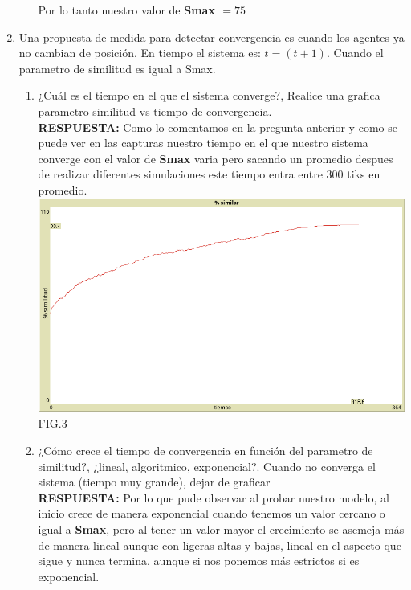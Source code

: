 \documentclass[12pt]{article}
\begin{document}
\begin{enumerate}
\begin{enumerate}
        Por lo tanto nuestro valor de \textbf{Smax $=75$}
    \end{enumerate}
    \item Una propuesta de medida para detectar convergencia es cuando los agentes ya no cambian de posición. En tiempo el sistema es: $t = (t+1)$.
    Cuando el parametro de similitud es igual a Smax.\\
    \begin{enumerate}
        \item ¿Cuál es el tiempo en el que el sistema converge?, Realice una grafica parametro-similitud vs tiempo-de-convergencia.\\
        
        \textbf{\color{red} RESPUESTA:} Como lo comentamos en la pregunta anterior y como se puede ver en las capturas nuestro tiempo en el que nuestro sistema converge con el valor de \textbf{Smax} varia pero sacando un promedio despues de realizar
        diferentes simulaciones este tiempo entra entre $300$ tiks en promedio.\\

        \includegraphics[scale = 0.40]{images/fig3.png} FIG.3\\

        \item ¿Cómo crece el tiempo de convergencia en función del parametro de similitud?, ¿lineal, algoritmico, exponencial?. Cuando no converga el sistema (tiempo muy grande), dejar de graficar\\
        
        \textbf{\color{red} RESPUESTA:} Por lo que pude observar al probar nuestro modelo, al inicio crece de manera exponencial cuando tenemos un valor cercano o igual a \textbf{Smax}, pero al tener
        un valor mayor el crecimiento se asemeja más de manera lineal aunque con ligeras altas y bajas, lineal en el aspecto que sigue y nunca termina, aunque si nos ponemos más estrictos si es exponencial.\\
        

\end{enumerate}
\end{enumerate}
\end{document}
